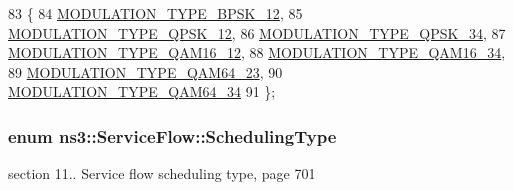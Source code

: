 \begin{DoxyCode}
83   \{
84     \hyperlink{classns3_1_1ServiceFlow_a40bfe31290c97789bf10adffd8b1acadae9121cf6eb75ccb2da96d3be64ed1bdb}{MODULATION\_TYPE\_BPSK\_12},
85     \hyperlink{classns3_1_1ServiceFlow_a40bfe31290c97789bf10adffd8b1acadaa1cd67cb4b29b4e78bf9c0828b0cafe6}{MODULATION\_TYPE\_QPSK\_12},
86     \hyperlink{classns3_1_1ServiceFlow_a40bfe31290c97789bf10adffd8b1acadaacf3950bfd6b7265f68b657c0a4eeb97}{MODULATION\_TYPE\_QPSK\_34},
87     \hyperlink{classns3_1_1ServiceFlow_a40bfe31290c97789bf10adffd8b1acada2ff5a1fcfd105f98f4341e2e1ec6288c}{MODULATION\_TYPE\_QAM16\_12},
88     \hyperlink{classns3_1_1ServiceFlow_a40bfe31290c97789bf10adffd8b1acada3ecb4ad5848841bc90258a225061edda}{MODULATION\_TYPE\_QAM16\_34},
89     \hyperlink{classns3_1_1ServiceFlow_a40bfe31290c97789bf10adffd8b1acada6a7e0bcf9c33214134446b1e88fab5c3}{MODULATION\_TYPE\_QAM64\_23},
90     \hyperlink{classns3_1_1ServiceFlow_a40bfe31290c97789bf10adffd8b1acada5885f8d0549d0713b9783152612e7ea8}{MODULATION\_TYPE\_QAM64\_34}
91   \};
\end{DoxyCode}
\subsubsection[{\texorpdfstring{Scheduling\+Type}{SchedulingType}}]{\setlength{\rightskip}{0pt plus 5cm}enum {\bf ns3\+::\+Service\+Flow\+::\+Scheduling\+Type}}\hypertarget{classns3_1_1ServiceFlow_a7990ba10be1e098328fd1e6382a26235}{}\label{classns3_1_1ServiceFlow_a7990ba10be1e098328fd1e6382a26235}


section 11.. Service flow scheduling type, page 701 

